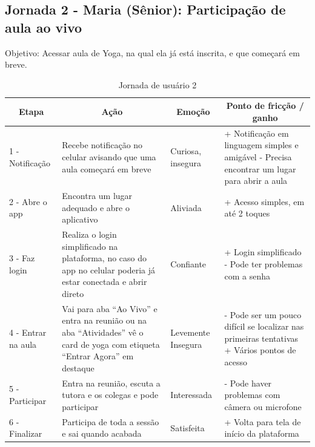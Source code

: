 \subsection{Jornada 2 - Maria (Sênior): Participação de aula ao vivo}
Objetivo: Acessar aula de Yoga, na qual ela já está inscrita, e que começará em breve.
\begin{table}[H]
\centering
\caption{Jornada de usuário 2}
\label{tab:jornada2}
\begin{tabular}{|m{3.2cm}|m{5cm}|m{2.5cm}|m{4.5cm}|}
\hline
\multicolumn{1}{|c|}{\textbf{Etapa}} & \multicolumn{1}{c|}{\textbf{Ação}} & \multicolumn{1}{c|}{\textbf{Emoção}} & \multicolumn{1}{c|}{\textbf{Ponto de fricção / ganho}} \\ \hline

1 - Notificação & Recebe notificação no celular avisando que uma aula começará em breve & Curiosa, insegura & + Notificação em linguagem simples e amigável \newline\newline - Precisa encontrar um lugar para abrir a aula \\ \hline

2 - Abre o app & Encontra um lugar adequado e abre o aplicativo & Aliviada & + Acesso simples, em até 2 toques \\ \hline

3 - Faz login & Realiza o login simplificado na plataforma, no caso do app no celular poderia já estar conectada e abrir direto & Confiante & + Login simplificado \newline\newline - Pode ter problemas com a senha \\ \hline

4 - Entrar na aula & Vai para aba ``Ao Vivo'' e entra na reunião ou na aba ``Atividades'' vê o card de yoga com etiqueta ``Entrar Agora'' em destaque & Levemente Insegura & - Pode ser um pouco difícil se localizar nas primeiras tentativas \newline\newline + Vários pontos de acesso \\ \hline

5 - Participar & Entra na reunião, escuta a tutora e os colegas e pode participar & Interessada & - Pode haver problemas com câmera ou microfone \\ \hline

6 - Finalizar & Participa de toda a sessão e sai quando acabada & Satisfeita & + Volta para tela de início da plataforma \\ \hline
\end{tabular}
\end{table}

